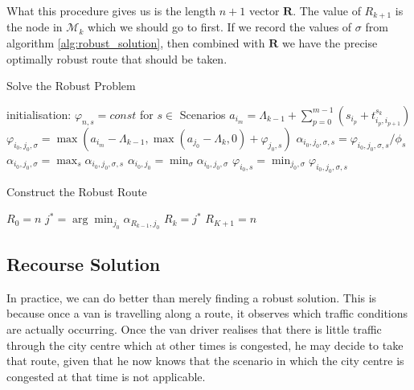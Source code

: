 What this procedure gives us is the length $n+1$ vector $\mathbf{R}$. The value of $R_{k+1}$ is the node in $\mathcal{M}_k$ which we should go to first. If we record the values of $\sigma$ from algorithm \ref{alg:robust_solution}, then combined with $\mathbf{R}$ we have the precise optimally robust route that should be taken.

\begin{algorithm} %
	\caption{Solve the Robust Problem}
	\label{alg:robust_solution} %
	\begin{algorithmic} %
		\STATE initialisation: $\varphi_{n, s} = const$ for $s \in $ Scenarios
		\STATE $a_{i_m}=\Lambda_{k-1}+\sum_{p=0}^{m-1}\left(s_{i_p}+t^{s_k}_{i_{p},i_{p+1}}\right)$
		\STATE 
		$\varphi_{i_0,j_0,\sigma}=\max(a_{i_m}-\Lambda_{k-1}, \max(a_{j_0} - \Lambda_k,0) + \varphi_{j_0, s})$
		\STATE $\alpha_{i_0,j_0,\sigma,s } = \varphi_{i_0,j_0,\sigma, s}/\phi_s$
		\ENDFOR
		\STATE $\alpha_{i_0, j_0, \sigma} = \max_s \alpha_{i_0, j_0, \sigma, s}$
		\ENDFOR
		\STATE $ \alpha_{i_0,j_0}=\min_{\sigma}\alpha_{i_0,j_0, \sigma}$
		\ENDFOR
			\STATE $\varphi_{i_0, s} = \min_{j_0, \sigma}\varphi_{i_0,j_0,\sigma, s }$
		\ENDFOR
		\ENDFOR
		\ENDFOR			
	\end{algorithmic}
\end{algorithm}
\begin{algorithm} %
	\caption{Construct the Robust Route}
	\label{alg:forward_robust_solution} %
	\begin{algorithmic} %
		\STATE $R_0 = n$
			\STATE $j^* = \arg\min_{j_0}\alpha_{R_{k-1}, j_0} $
			\STATE $R_{k} = j^*$
		\ENDFOR
		\STATE $R_{K+1} = n$
	\end{algorithmic}
\end{algorithm}


\subsection{Recourse Solution}

In practice, we can do better than merely finding a robust solution. This is because once a van is travelling along a route, it observes which traffic conditions are actually occurring. Once the van driver realises that there is little traffic through the city centre which at other times is congested, he may decide to take that route, given that he now knows that the scenario in which the city centre is congested at that time is not applicable.

